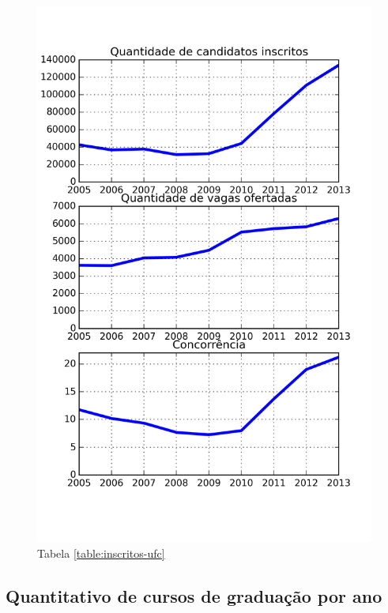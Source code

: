 \documentclass{report}
\begin{document}
\begin{figure}[H]
	\includegraphics{img/inscritos_ufc.png}
	\caption{Tabela \ref{table:inscritos-ufc}}
	\label{img:inscritos-ufc}
\end{figure}

\subsection{Quantitativo de cursos de graduação por ano}
\end{document}

